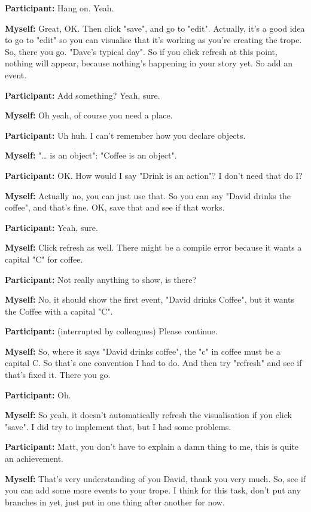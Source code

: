 \documentclass[11pt]{report}
\begin{document}
\begin{linenumbers}
\textbf{Participant:} Hang on. Yeah.

\textbf{Myself:} Great, OK. Then click "save", and go to "edit". Actually, it's a good idea to go to "edit" so you can visualise that it's working as you're creating the trope. So, there you go. "Dave's typical day". So if you click refresh at this point, nothing will appear, because nothing's happening in your story yet. So add an event.

\textbf{Participant:} Add something? Yeah, sure.

\textbf{Myself:} Oh yeah, of course you need a place.

\textbf{Participant:} Uh huh. I can't remember how you declare objects.

\textbf{Myself:} "\ldots{} is an object": "Coffee is an object".

\textbf{Participant:} OK. How would I say "Drink is an action"? I don't need
that do I?

\textbf{Myself:} Actually no, you can just use that. So you can say "David drinks the coffee", and that's fine. OK, save that and see if that works.

\textbf{Participant:} Yeah, sure.

\textbf{Myself:} Click refresh as well. There might be a compile error because it wants a capital "C" for coffee.

\textbf{Participant:} Not really anything to show, is there?

\textbf{Myself:} No, it should show the first event, "David drinks Coffee", but it wants the Coffee with a capital "C".

\textbf{Participant:} (interrupted by colleagues) Please continue.

\textbf{Myself:} So, where it says "David drinks coffee", the "c" in coffee must be a capital C. So that's one convention I had to do. And then try "refresh" and see if that's fixed it. There you go.

\textbf{Participant:} Oh.

\textbf{Myself:} So yeah, it doesn't automatically refresh the visualisation if you click "save". I did try to implement that, but I had some problems.

\textbf{Participant:} Matt, you don't have to explain a damn thing to me, this is quite an achievement.

\textbf{Myself:} That's very understanding of you David, thank you very much. So, see if you can add some more events to your trope. I think for this task, don't put any branches in yet, just put in one thing after another for now.


\end{linenumbers}
\end{document}
